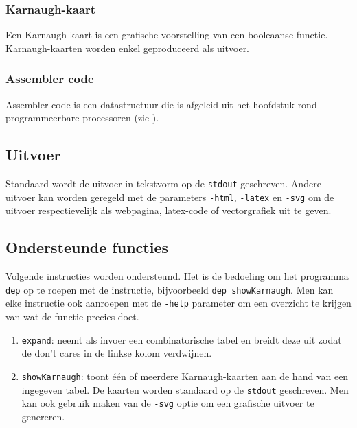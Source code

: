 \subsubsection{Karnaugh-kaart}
Een Karnaugh-kaart is een grafische voorstelling van een booleaanse-functie. Karnaugh-kaarten worden enkel geproduceerd als uitvoer.
\subsubsection{Assembler code}
Assembler-code is een datastructuur die is afgeleid uit het hoofdstuk rond programmeerbare processoren (zie ).
\subsection{Uitvoer}
Standaard wordt de uitvoer in tekstvorm op de \texttt{stdout} geschreven. Andere uitvoer kan worden geregeld met de parameters \texttt{-html}, \texttt{-latex} en \texttt{-svg} om de uitvoer respectievelijk als webpagina, latex-code of vectorgrafiek uit te geven.
\subsection{Ondersteunde functies}
Volgende instructies worden ondersteund. Het is de bedoeling om het programma \texttt{dep} op te roepen met de instructie, bijvoorbeeld \texttt{dep showKarnaugh}. Men kan elke instructie ook aanroepen met de \texttt{-help} parameter om een overzicht te krijgen van wat de functie precies doet.
\begin{enumerate}
 \item \texttt{expand}: neemt als invoer een combinatorische tabel en breidt deze uit zodat de don't cares in de linkse kolom verdwijnen.
 \item \texttt{showKarnaugh}: toont \'e\'en of meerdere Karnaugh-kaarten aan de hand van een ingegeven tabel. De kaarten worden standaard op de \texttt{stdout} geschreven. Men kan ook gebruik maken van de \texttt{-svg} optie om een grafische uitvoer te genereren.
\end{enumerate}
